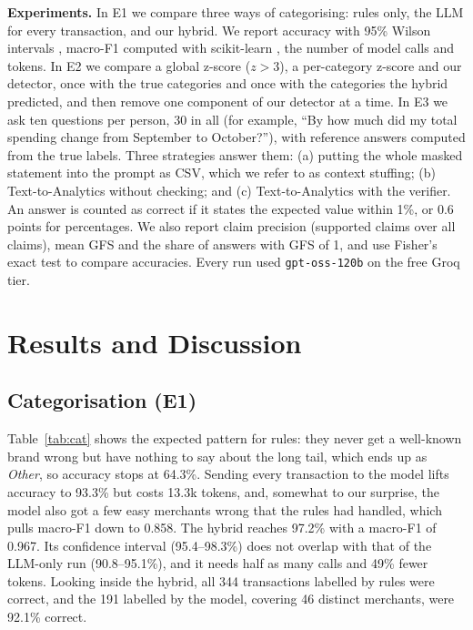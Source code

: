 \documentclass[conference]{IEEEtran}
\begin{document}
\textbf{Experiments.} In E1 we compare three ways of categorising: rules only, the LLM for every transaction, and our hybrid. We report accuracy with 95\% Wilson intervals \cite{wilson1927}, macro-F1 computed with scikit-learn \cite{pedregosa2011}, the number of model calls and tokens. In E2 we compare a global z-score ($z>3$), a per-category z-score and our detector, once with the true categories and once with the categories the hybrid predicted, and then remove one component of our detector at a time. In E3 we ask ten questions per person, 30 in all (for example, ``By how much did my total spending change from September to October?''), with reference answers computed from the true labels. Three strategies answer them: (a) putting the whole masked statement into the prompt as CSV, which we refer to as context stuffing; (b) Text-to-Analytics without checking; and (c) Text-to-Analytics with the verifier. An answer is counted as correct if it states the expected value within 1\%, or 0.6 points for percentages. We also report claim precision (supported claims over all claims), mean GFS and the share of answers with GFS of 1, and use Fisher's exact test \cite{fisher1925} to compare accuracies. Every run used \texttt{gpt-oss-120b} on the free Groq tier.

\section{Results and Discussion}
\subsection{Categorisation (E1)}
Table~\ref{tab:cat} shows the expected pattern for rules: they never get a well-known brand wrong but have nothing to say about the long tail, which ends up as \emph{Other}, so accuracy stops at 64.3\%. Sending every transaction to the model lifts accuracy to 93.3\% but costs 13.3k tokens, and, somewhat to our surprise, the model also got a few easy merchants wrong that the rules had handled, which pulls macro-F1 down to 0.858. The hybrid reaches 97.2\% with a macro-F1 of 0.967. Its confidence interval (95.4--98.3\%) does not overlap with that of the LLM-only run (90.8--95.1\%), and it needs half as many calls and 49\% fewer tokens. Looking inside the hybrid, all 344 transactions labelled by rules were correct, and the 191 labelled by the model, covering 46 distinct merchants, were 92.1\% correct.
\end{document}
